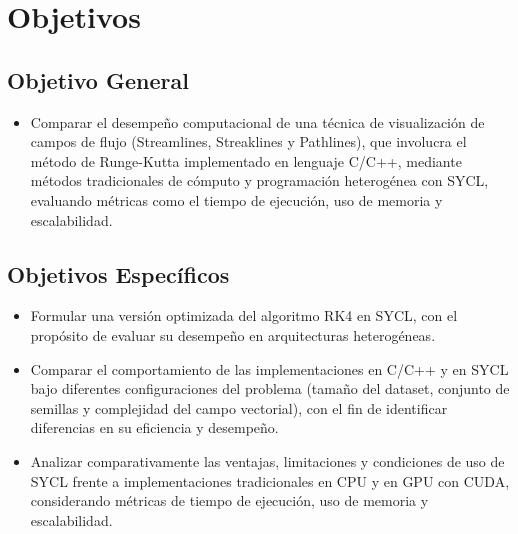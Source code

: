 \section{Objetivos}
\subsection{Objetivo General}
\begin{itemize}

	\item Comparar el desempeño computacional de una técnica de visualización de campos de flujo (Streamlines, Streaklines y Pathlines), que involucra el método de Runge-Kutta implementado en lenguaje C/C++, mediante métodos tradicionales de cómputo y programación heterogénea con SYCL, evaluando métricas como el tiempo de ejecución, uso de memoria y escalabilidad.

\end{itemize}

\subsection{Objetivos Específicos}

\begin{itemize}
	\item Formular una versión optimizada del algoritmo RK4 en SYCL, con el propósito de evaluar su desempeño en arquitecturas heterogéneas.
	\item Comparar el comportamiento de las implementaciones en C/C++ y en SYCL bajo diferentes configuraciones del problema (tamaño del dataset, conjunto de semillas y complejidad del campo vectorial), con el fin de identificar diferencias en su eficiencia y desempeño.
	\item Analizar comparativamente las ventajas, limitaciones y condiciones de uso de SYCL frente a implementaciones tradicionales en CPU y en GPU con CUDA, considerando métricas de tiempo de ejecución, uso de memoria y escalabilidad.
\end{itemize}
